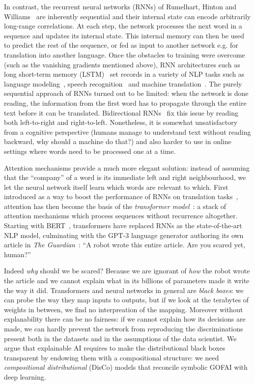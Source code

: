 In contrast, the recurrent neural networks (RNNs) of Rumelhart, Hinton and Williams~\cite{RumelhartEtAl86} are inherently sequential and their internal state can encode arbitrarily long-range correlations.
At each step, the network processes the next word in a sequence and updates its internal state.
This internal memory can then be used to predict the rest of the sequence, or fed as input to another network e.g. for translation into another language.
Once the obstacles to training were overcome (such as the vanishing gradients mentioned above), RNN architectures such as long short-term memory (LSTM)~\cite{HochreiterSchmidhuber97} set records in a variety of NLP tasks such as language modeling~\cite{SutskeverEtAl11}, speech recognition~\cite{GravesEtAl13} and machine translation~\cite{SutskeverEtAl14}.
The purely sequential approach of RNNs turned out to be limited: when the network is done reading, the information from the first word has to propagate through the entire text before it can be translated.
Bidirectional RNNs~\cite{SchusterPaliwal97} fix this issue by reading both left-to-right and right-to-left.
Nonetheless, it is somewhat unsatisfactory from a cognitive perspective (humans manage to understand text without reading backward, why should a machine do that?) and also harder to use in online settings where words need to be processed one at a time.

Attention mechanisms provide a much more elegant solution: instead of assuming that the ``company'' of a word is its immediate left and right neighbourhood, we let the neural network itself learn which words are relevant to which.
First introduced as a way to boost the performance of RNNs on translation tasks~\cite{BahdanauEtAl16}, attention has then become the basis of the \emph{transformer model}~\cite{VaswaniEtAl17}: a stack of attention mechanisms which process sequences without recurrence altogether.
Starting with BERT~\cite{DevlinEtAl19}, transformers have replaced RNNs as the state-of-the-art NLP model, culminating with the GPT-3 language generator authoring its own article in \emph{The Guardian}~\cite{GPT-320}:
``A robot wrote this entire article. Are you scared yet, human?''

Indeed \emph{why} should we be scared?
Because we are ignorant of \emph{how} the robot wrote the article and we cannot explain what in its billions of parameters made it write the way it did.
Transformers and neural networks in general are \emph{black boxes}: we can probe the way they map inputs to outputs, but if we look at the terabytes of weights in between, we find no interpreation of the mapping.
Moreover without explanability there can be no fairness: if we cannot explain how its decisions are made, we can hardly prevent the network from reproducing the discriminations present both in the datasets and in the assumptions of the data scientist.
We argue that explainable AI requires to make the distributional black boxes transparent by endowing them with a compositional structure: we need \emph{compositional distributional} (DisCo) models that reconcile symbolic GOFAI with deep learning.

